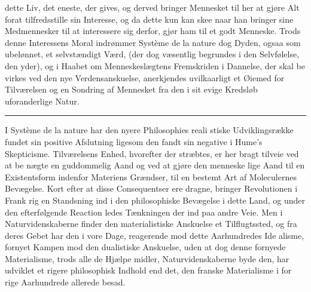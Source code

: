 \documentclass[12pt,a4paper]{book}
\newcommand{\divrule}{\begin{center}\rule{2cm}{0.4pt}\end{center}}
\begin{document}
dette Liv, det eneste, der gives, og derved bringer Mennesket
til her at gjøre Alt forat tilfredsstille sin Interesse, og da dette
kun kan skee naar han bringer sine Medmennesker til at
interessere sig derfor, gjør ham til et godt Menneske. Trods
denne Interessens Moral indrømmer Système de la nature dog
Dyden, ogsaa som ubelønnet, et selvstændigt Værd, (der dog
væsentlig begrundes i den Selvfølelse, den yder), og i Haabet
om Menneskeslægtens Fremskriden i Dannelse, der skal be\-%
virkes ved den nye Verdensanskuelse, anerkjendes uvilkaarligt
et Øiemed for Tilværelsen og en Sondring af Mennesket fra
den i sit evige Kredsløb uforanderlige Natur.

\divrule
%

I Système de la nature har den nyere Philosophies reali\-%
stiske Udviklingsrække fundet sin positive Afslutning ligesom
den fandt sin negative i Hume's Skepticisme. Tilværelsens
Enhed, hvorefter der stræbtes, er her bragt tilveie ved at be\-%
nægte en guddommelig Aand og ved at gjøre den menneske\-%
lige Aand til en Existentsform indenfor Materiens Grændser,
til en bestemt Art af Moleculernes Bevægelse. Kort efter at
disse Consequentser ere dragne, bringer Revolutionen i Frank\-%
rig en Standsning ind i den philosophiske Bevægelse i dette
Land, og under den efterfølgende Reaction ledes Tænkningen
der ind paa andre Veie. Men i Naturvidenskaberne finder den
materialistiske Anskuelse et Tilflugtssted, og fra deres Gebet
har den i vore Dage, reagerende mod dette Aarhundredes Ide\-%
alisme, fornyet Kampen mod den dualistiske Anskuelse, uden
at dog denne fornyede Materialisme, trods alle de Hjælpe\-%
midler, Naturvidenskaberne byde den, har udviklet et rigere
philosophisk Indhold end det, den franske Materialisme i for\-%
rige Aarhundrede allerede besad.
\end{document}
